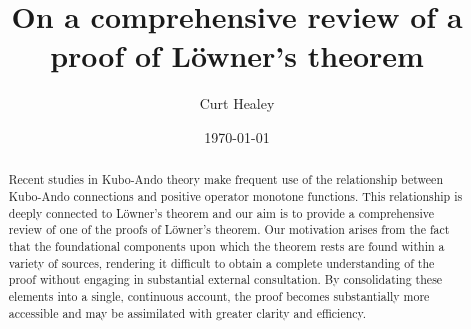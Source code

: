 \documentclass[12pt,a4paper]{amsart}
\theoremstyle{definition}
\begin{document}
	\title{On a comprehensive review of a proof of L\"owner's theorem}
	\author{Curt Healey}
	\address{Curt Healey\\
		Department of Mathematics\\
		Faculty of Science\\
		University of Malta\\
		Msida MSD 2080  Malta}
	
	
	\date{\today}
	\begin{abstract}
		Recent studies in Kubo-Ando theory make frequent use of the relationship between Kubo-Ando connections and positive operator monotone functions. This relationship is deeply connected to L\"owner's theorem and our aim is to provide a comprehensive review of one of the proofs of L\"owner's theorem. Our motivation arises from the fact that the foundational components upon which the theorem rests are found within a variety of sources, rendering it difficult to obtain a complete understanding of the proof without engaging in substantial external consultation. By consolidating these elements into a single, continuous account, the proof becomes substantially more accessible and may be assimilated with greater clarity and efficiency.
	\end{abstract}
	\maketitle
	
\end{document}
